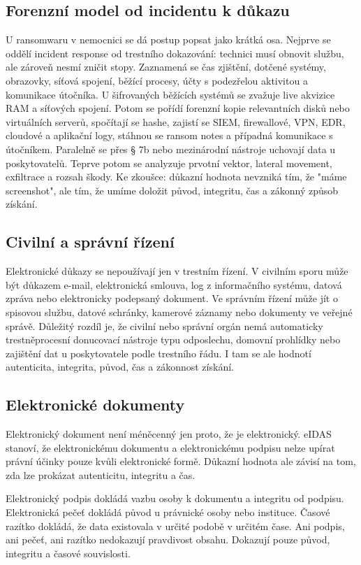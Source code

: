 \subsection*{Forenzní model od incidentu k důkazu}
U ransomwaru v nemocnici se dá postup popsat jako krátká osa. Nejprve se oddělí incident response od trestního dokazování: technici musí obnovit službu, ale zároveň nesmí zničit stopy. Zaznamená se čas zjištění, dotčené systémy, obrazovky, síťová spojení, běžící procesy, účty s podezřelou aktivitou a komunikace útočníka. U šifrovaných běžících systémů se zvažuje live akvizice RAM a síťových spojení. Potom se pořídí forenzní kopie relevantních disků nebo virtuálních serverů, spočítají se hashe, zajistí se SIEM, firewallové, VPN, EDR, cloudové a aplikační logy, stáhnou se ransom notes a případná komunikace s útočníkem. Paralelně se přes § 7b nebo mezinárodní nástroje uchovají data u poskytovatelů. Teprve potom se analyzuje prvotní vektor, lateral movement, exfiltrace a rozsah škody. Ke zkoušce: důkazní hodnota nevzniká tím, že "máme screenshot", ale tím, že umíme doložit původ, integritu, čas a zákonný způsob získání.

\subsection*{Civilní a správní řízení}
Elektronické důkazy se nepoužívají jen v trestním řízení. V civilním sporu může být důkazem e-mail, elektronická smlouva, log z informačního systému, datová zpráva nebo elektronicky podepsaný dokument. Ve správním řízení může jít o spisovou službu, datové schránky, kamerové záznamy nebo dokumenty ve veřejné správě. Důležitý rozdíl je, že civilní nebo správní orgán nemá automaticky trestněprocesní donucovací nástroje typu odposlechu, domovní prohlídky nebo zajištění dat u poskytovatele podle trestního řádu. I tam se ale hodnotí autenticita, integrita, původ, čas a zákonnost získání.

\subsection*{Elektronické dokumenty}
Elektronický dokument není méněcenný jen proto, že je elektronický. eIDAS stanoví, že elektronickému dokumentu a elektronickému podpisu nelze upírat právní účinky pouze kvůli elektronické formě. Důkazní hodnota ale závisí na tom, zda lze prokázat autenticitu, integritu a čas.

Elektronický podpis dokládá vazbu osoby k dokumentu a integritu od podpisu. Elektronická pečeť dokládá původ u právnické osoby nebo instituce. Časové razítko dokládá, že data existovala v určité podobě v určitém čase. Ani podpis, ani pečeť, ani razítko nedokazují pravdivost obsahu. Dokazují pouze původ, integritu a časové souvislosti.

